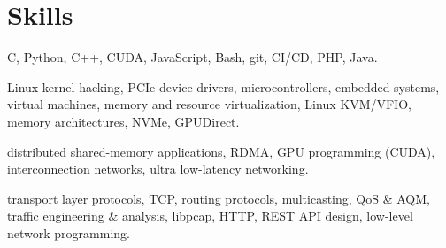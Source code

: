 \section{Skills}
{C, Python, C++, CUDA, JavaScript, Bash, git, CI/CD, PHP, Java.}

{Linux kernel hacking, PCIe device drivers, microcontrollers, embedded systems, virtual machines, memory and resource virtualization, Linux KVM/VFIO, memory architectures, NVMe, GPUDirect.}

{distributed shared-memory applications, RDMA, GPU programming (CUDA), interconnection networks, ultra low-latency networking.}

{transport layer protocols, TCP, routing protocols, multicasting, QoS \& AQM, traffic engineering \& analysis, libpcap, HTTP, REST API design, low-level network programming.}

%
%
%
%
